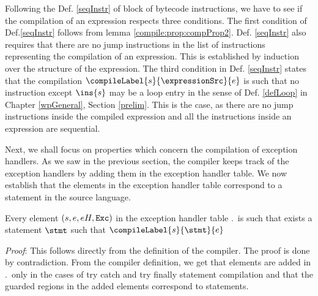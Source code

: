 Following the Def. \ref{seqInstr} of block of bytecode instructions,  we have to see if the compilation of an expression respects
three conditions.
The first condition of Def.\ref{seqInstr}  follows from lemma \ref{compile:prop:compProp2}. 
Def. \ref{seqInstr} also requires that there are no jump instructions  in the list of instructions representing the  compilation of an expression.
This is established by induction over the structure of the expression.
The third condition in Def. \ref{seqInstr} states that  the compilation $\compileLabel{s}{\expressionSrc}{e}$ is such that 
  no instruction except $\ins{s}$ may be  a loop entry  in the sense of Def.  \ref{defLoop} in Chapter
\ref{wpGeneral}, Section \ref{prelim}. This is the case, as there are no jump instructions inside the compiled expression  and all the instructions inside an
expression are sequential.\\
\Qed 

Next, we shall focus on properties which concern the compilation of exception handlers.
As we saw in the previous section, the compiler keeps track of the exception 
handlers by adding them in the exception handler table. We now establish that the elements in the exception handler
 table correspond to a statement
in the source language.

\begin{compProp7}\label{compile:prop:compProp7}
Every element  $ (s,e, eH, \mbox{\rm\texttt{Exc}} )$  in the exception handler table \methodd.\excHandlerTable  \
  is such that exists a statement $\stmt$ such that $\compileLabel{s}{\stmt}{e}$


\end{compProp7} 
\textit{Proof}:
This follows directly from the definition of the compiler. 
The proof is done by contradiction. From the compiler definition, we get that  elements are added in 
 \methodd.\excHandlerTable \ only in the cases of 
try catch and try finally statement compilation and that the guarded regions in the added elements correspond to statements. \\
\Qed

